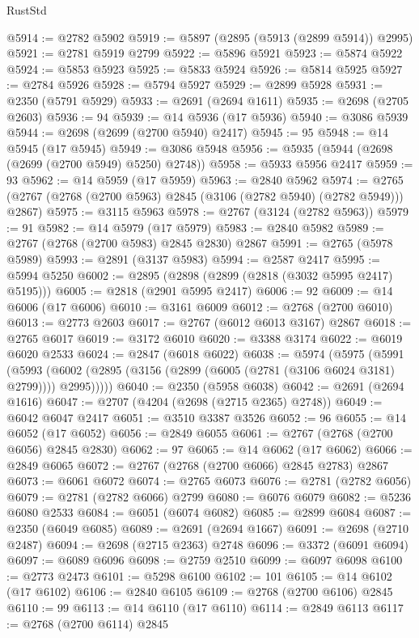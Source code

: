 \begin{lexlean}{RustStd}
\begin{coremodule}
@5914 := @2782 @5902
@5919 := @5897 (@2895 (@5913 (@2899 @5914)) @2995)
@5921 := @2781 @5919 @2799
@5922 := @5896 @5921
@5923 := @5874 @5922
@5924 := @5853 @5923
@5925 := @5833 @5924
@5926 := @5814 @5925
@5927 := @2784 @5926
@5928 := @5794 @5927
@5929 := @2899 @5928
@5931 := @2350 (@5791 @5929)
@5933 := @2691 (@2694 @1611)
@5935 := @2698 (@2705 @2603)
@5936 := 94
@5939 := @14 @5936 (@17 @5936)
@5940 := @3086 @5939
@5944 := @2698 (@2699 (@2700 @5940) @2417)
@5945 := 95
@5948 := @14 @5945 (@17 @5945)
@5949 := @3086 @5948
@5956 := @5935 (@5944 (@2698 (@2699 (@2700 @5949) @5250) @2748))
@5958 := @5933 @5956 @2417
@5959 := 93
@5962 := @14 @5959 (@17 @5959)
@5963 := @2840 @5962
@5974 := @2765 (@2767 (@2768 (@2700 @5963) @2845 (@3106 (@2782 @5940) (@2782 @5949))) @2867)
@5975 := @3115 @5963
@5978 := @2767 (@3124 (@2782 @5963))
@5979 := 91
@5982 := @14 @5979 (@17 @5979)
@5983 := @2840 @5982
@5989 := @2767 (@2768 (@2700 @5983) @2845 @2830) @2867
@5991 := @2765 (@5978 @5989)
@5993 := @2891 (@3137 @5983)
@5994 := @2587 @2417
@5995 := @5994 @5250
@6002 := @2895 (@2898 (@2899 (@2818 (@3032 @5995 @2417) @5195)))
@6005 := @2818 (@2901 @5995 @2417)
@6006 := 92
@6009 := @14 @6006 (@17 @6006)
@6010 := @3161 @6009
@6012 := @2768 (@2700 @6010)
@6013 := @2773 @2603
@6017 := @2767 (@6012 @6013 @3167) @2867
@6018 := @2765 @6017
@6019 := @3172 @6010
@6020 := @3388 @3174
@6022 := @6019 @6020 @2533
@6024 := @2847 (@6018 @6022)
@6038 := @5974
    (@5975
      (@5991
        (@5993 (@6002 (@2895 (@3156 (@2899 (@6005 (@2781 (@3106 @6024 @3181) @2799)))) @2995)))))
@6040 := @2350 (@5958 @6038)
@6042 := @2691 (@2694 @1616)
@6047 := @2707 (@4204 (@2698 (@2715 @2365) @2748))
@6049 := @6042 @6047 @2417
@6051 := @3510 @3387 @3526
@6052 := 96
@6055 := @14 @6052 (@17 @6052)
@6056 := @2849 @6055
@6061 := @2767 (@2768 (@2700 @6056) @2845 @2830)
@6062 := 97
@6065 := @14 @6062 (@17 @6062)
@6066 := @2849 @6065
@6072 := @2767 (@2768 (@2700 @6066) @2845 @2783) @2867
@6073 := @6061 @6072
@6074 := @2765 @6073
@6076 := @2781 (@2782 @6056)
@6079 := @2781 (@2782 @6066) @2799
@6080 := @6076 @6079
@6082 := @5236 @6080 @2533
@6084 := @6051 (@6074 @6082)
@6085 := @2899 @6084
@6087 := @2350 (@6049 @6085)
@6089 := @2691 (@2694 @1667)
@6091 := @2698 (@2710 @2487)
@6094 := @2698 (@2715 @2363) @2748
@6096 := @3372 (@6091 @6094)
@6097 := @6089 @6096
@6098 := @2759 @2510
@6099 := @6097 @6098
@6100 := @2773 @2473
@6101 := @5298 @6100
@6102 := 101
@6105 := @14 @6102 (@17 @6102)
@6106 := @2840 @6105
@6109 := @2768 (@2700 @6106) @2845
@6110 := 99
@6113 := @14 @6110 (@17 @6110)
@6114 := @2849 @6113
@6117 := @2768 (@2700 @6114) @2845

\end{coremodule}
\end{lexlean}
